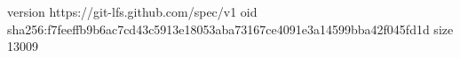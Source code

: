 version https://git-lfs.github.com/spec/v1
oid sha256:f7feeffb9b6ac7cd43c5913e18053aba73167ce4091e3a14599bba42f045fd1d
size 13009
